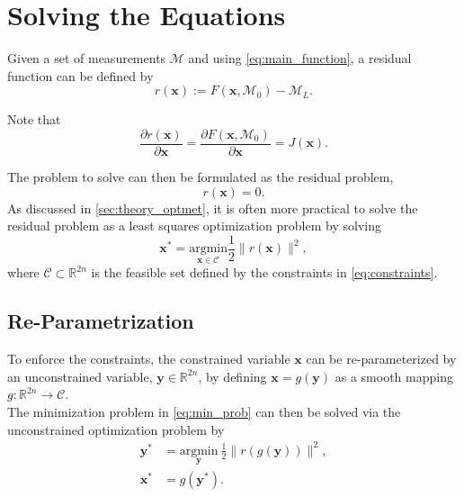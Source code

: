 \newpage
\newpage
\section{Solving the Equations}
\label{sec:solving_eq}

Given a set of measurements $\mathcal{M}$ and using \cref{eq:main_function}, a residual function can be defined by
\begin{equation}
    \label{eq:residual}
    r(\mathbf{x}) := F(\mathbf{x},\mathcal{M}_0) - \mathcal{M}_L.
\end{equation}

Note that
\begin{equation*}
    \frac{\partial r(\mathbf{x})}{\partial \mathbf{x}} =\frac{\partial F(\mathbf{x},\mathcal{M}_0)}{\partial \mathbf{x}} = J(\mathbf{x}).
\end{equation*}

The problem to solve can then be formulated as the residual problem,
\begin{equation*}
    r(\mathbf{x})=0.
\end{equation*}
As discussed in \autoref{sec:theory_optmet}, it is often more practical to solve the residual problem as a least squares optimization problem by solving
\begin{equation}
\label{eq:min_prob}
    \mathbf{x}^* = \underset{\mathbf{x}\in \mathcal{C}}{\text{argmin}} \frac{1}{2}\|r(\mathbf{x})\|^2,
\end{equation}
where $\mathcal{C} \subset \mathbb{R}^{2n}$ is the feasible set defined by the constraints in \cref{eq:constraints}.\\ 

\subsection{Re-Parametrization}
To enforce the constraints, the constrained variable $\mathbf{x}$ can be re-parameterized by an unconstrained variable, $\mathbf{y} \in \mathbb{R}^{2n}$, by defining $\mathbf{x}=g(\mathbf{y})$ as a smooth mapping $g : \mathbb{R}^{2n} \to \mathcal{C}$.\\

The minimization problem in \cref{eq:min_prob} can then be solved via the unconstrained optimization problem by
\begin{equation}
\label{eq:min_prob_via_y}
\begin{aligned}
    \mathbf{y}^* &= \underset{\mathbf{y}}{\text{argmin}}\ \frac{1}{2}\| r(g(\mathbf{y}))\|^2, \\
    \mathbf{x}^* &= g(\mathbf{y}^*).
\end{aligned}
\end{equation}

